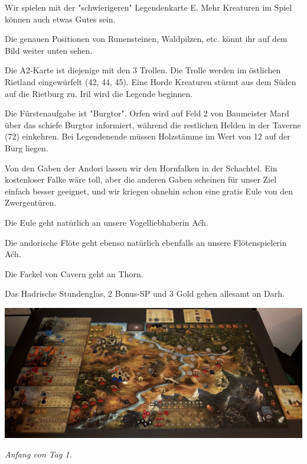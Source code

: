 \documentclass[10pt, a4paper, oneside]{book}
\begin{document}
{Wir spielen mit der "schwierigeren" Legendenkarte E. Mehr Kreaturen im Spiel können auch etwas Gutes sein.



Die genauen Positionen von Runensteinen, Waldpilzen, etc. könnt ihr auf dem Bild weiter unten sehen.



Die A2-Karte ist diejenige mit den 3 Trollen. Die Trolle werden im östlichen Rietland eingewürfelt (42, 44, 45). Eine Horde Kreaturen stürmt aus dem Süden auf die Rietburg zu. Iril wird die Legende beginnen.



Die Fürstenaufgabe ist "Burgtor". Orfen wird auf Feld 2 von Baumeister Mard über das schiefe Burgtor informiert, während die restlichen Helden in der Taverne (72) einkehren. Bei Legendenende müssen Holzstämme im Wert von 12 auf der Burg liegen.



Von den Gaben der Andori lassen wir den Hornfalken in der Schachtel. Ein kostenloser Falke wäre toll, aber die anderen Gaben scheinen für unser Ziel einfach besser geeignet, und wir kriegen ohnehin schon eine gratis Eule von den Zwergentüren.



Die Eule geht natürlich an unsere Vogelliebhaberin Aćh.

Die andorische Flöte geht ebenso natürlich ebenfalls an unsere Flötenspielerin Aćh.

Die Fackel von Cavern geht an Thorn.

Das Hadrische Stundenglas, 2 Bonus-SP und 3 Gold gehen allesamt an Darh.\bigskip






\includegraphics[width=\textwidth]{Das Erbe des Wunderkindes/Bilder/Tag 1 Anfang.jpg}

\textit{Anfang von Tag 1.}\bigskip







}
\end{document}
